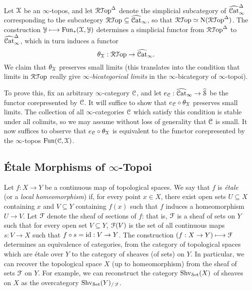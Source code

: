\begin{remark}\label{sablewise}
Let $\operatorname{\mathcal{X}}$ be an $\infty$-topos, and let $\operatorname{\mathcal{R}{\mathcal T}op}^{\Delta}$ denote the simplicial
subcategory of $\widehat{\operatorname{\mathcal{C}at}}_{\infty}^{\Delta}$ corresponding to the subcategory
$\operatorname{\mathcal{R}{\mathcal T}op} \subseteq \widehat{\operatorname{\mathcal{C}at}}_{\infty}$, so that
$\operatorname{\mathcal{R}{\mathcal T}op} \simeq \operatorname{N}( \operatorname{\mathcal{R}{\mathcal T}op}^{\Delta})$. The construction 
$\operatorname{\mathcal{Y}} \longmapsto \operatorname{Fun}_{\ast}( \operatorname{\mathcal{X}}, \operatorname{\mathcal{Y}})$ determines a simplicial functor from
$\operatorname{\mathcal{R}{\mathcal T}op}^{\Delta}$ to $\widehat{\operatorname{\mathcal{C}at}}_{\infty}^{\Delta}$, which in turn induces a functor
$$\theta_{\operatorname{\mathcal{X}}}: \operatorname{\mathcal{R}{\mathcal T}op} \rightarrow \widehat{\operatorname{\mathcal{C}at}}_{\infty}.$$
We claim that $\theta_{\operatorname{\mathcal{X}}}$ preserves small limits (this translates
into the condition that limits in $\operatorname{\mathcal{R}{\mathcal T}op}$ really give {\em $\infty$-bicategorical limits} in the
$\infty$-bicategory of $\infty$-topoi).

To prove this, fix an arbitrary $\infty$-category $\operatorname{\mathcal{C}}$, and let $e_{\operatorname{\mathcal{C}}}: \widehat{\operatorname{\mathcal{C}at}}_{\infty} \rightarrow \widehat{\operatorname{\mathcal{S}}}$ be the functor corepresented by $\operatorname{\mathcal{C}}$. It will suffice to show
that $e_{\operatorname{\mathcal{C}}} \circ \theta_{\operatorname{\mathcal{X}}}$ preserves small limits. The collection of all $\infty$-categories $\operatorname{\mathcal{C}}$ which satisfy this condition is stable under all colimits, so we may assume without loss of generality that $\operatorname{\mathcal{C}}$ is small. It now suffices to observe that $e_{\operatorname{\mathcal{C}}} \circ \theta_{\operatorname{\mathcal{X}}}$ is
equivalent to the functor corepresented by the $\infty$-topos $\operatorname{Fun}(\operatorname{\mathcal{C}}, \operatorname{\mathcal{X}})$.
\end{remark}

\subsection{\'{E}tale Morphisms of $\infty$-Topoi}\label{gemor2}

Let $f: X \rightarrow Y$ be a continuous map of topological spaces.
We say that $f$ is {\it \'{e}tale} (or a {\it local homeomorphism}) if, for
every point $x \in X$, there exist open sets $U \subseteq X$
containing $x$ and $V \subseteq Y$ containing $f(x)$ such that
$f$ induces a homeomorphism $U \rightarrow V$.  
Let $\operatorname{\mathcal{F}}$ denote the sheaf of sections of $f$: that is, $\operatorname{\mathcal{F}}$ is a sheaf of
sets on $Y$ such that for every open set $V \subseteq Y$,
$\operatorname{\mathcal{F}}(V)$ is the set of all continuous maps $s: V \rightarrow X$ such that
$f \circ s = \operatorname{id}: V \rightarrow Y$. The construction
$(f: X \rightarrow Y) \longmapsto \operatorname{\mathcal{F}}$ determines an equivalence of
categories, from the category of topological spaces which
are \'{e}tale over $Y$ to the category of sheaves (of sets) on $Y$.
In particular, we can recover the topological space $X$ (up to homeomorphism) from the sheaf of sets $\operatorname{\mathcal{F}}$ on $Y$. For example, we
can reconstruct the category $\operatorname{Shv}_{\operatorname{\mathcal{S}et}}(X)$ of sheaves on $X$
as the overcategory $\operatorname{Shv}_{\operatorname{\mathcal{S}et}}(Y)_{/ \operatorname{\mathcal{F}}}$.

